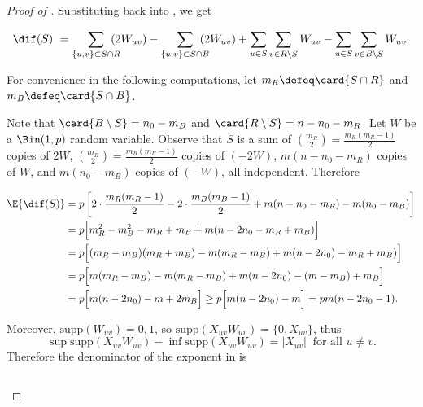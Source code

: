 \documentclass{toc}
\begin{document}
\begin{proof}[Proof of ]
				\noindent Substituting back into , we get
				\begin{linenomath}\begin{equation*}
						\dif(S) \ = \sum_{\{u, v\} \subset S\cap R}\hspace{-1em}\left(2W_{uv}\right)
						- \sum_{\{u, v\} \subset S\cap B}\hspace{-1em}\left(2 W_{uv}\right)
						+ \sum_{u\in S} \sum_{v\in R\setminus S}W_{uv} - \sum_{u\in S} \sum_{v\in B\setminus S}W_{uv} .
				\end{equation*}\end{linenomath}
				For convenience in the following computations, let $m_R\defeq \card{S\cap R}$ and $m_B \defeq \card{S\cap B}$.
				
				\noindent Note that $\card{B\setminus S} = n_0 - m_B$ and $\card{R\setminus S} = n - n_0 - m_R$.
				Let $W$ be a $\Bin(1, p)$ random variable.
				Observe that $S$ is a sum of
				$\binom{m_R}{2} = \frac{m_R(m_R - 1)}{2}$ copies of $2W$,
				$\binom{m_B}{2} = \frac{m_B(m_B - 1)}{2}$ copies of $(-2W)$,
				$m(n - n_0 - m_R)$ copies of $W$,
				and $m(n_0 - m_B)$ copies of $(-W)$, all independent.
				Therefore
				\begin{linenomath}\begin{equation*}  \label{eq:temp97}
						\begin{aligned}
							\E{\dif(S)}
							& = p\left[2\cdot\frac{m_R(m_R - 1)}{2} - 2\cdot\frac{m_B(m_B - 1)}{2} + m(n - n_0 - m_R) - m(n_0 - m_B) \right] \\
							& = p\Bigl[m_R^2 - m_B^2 - m_R + m_B + m(n - 2n_0 - m_R + m_B)\Bigr] \\
							& = p\Bigl[(m_R - m_B)(m_R + m_B) - m(m_R - m_B) + m(n - 2n_0) - m_R + m_B)\Bigr] \\
							& = p\Bigl[m(m_R - m_B) - m(m_R - m_B) + m(n - 2n_0) - (m - m_B) + m_B\Bigr] \\
							& = p\Bigl[m(n - 2n_0) - m + 2m_B\Bigr] \ge p\Bigl[m(n - 2n_0) - m\Bigr] = pm(n - 2n_0 - 1).
						\end{aligned}
				\end{equation*}\end{linenomath}
				Moreover, $\text{supp}(W_{uv}) = {0, 1}$, so $\text{supp}(X_{uv}W_{uv}) = \{0, X_{uv}\}$, thus
				\[
				\sup \text{supp}(X_{uv}W_{uv}) - \inf \text{supp}(X_{uv}W_{uv}) = |X_{uv}| \ \text{ for all } u\neq v.
				\]
				Therefore the denominator of the exponent in  is
				\begin{linenomath}\begin{equation*}

\end{equation*}
\end{linenomath}
\end{proof}
\end{document}

